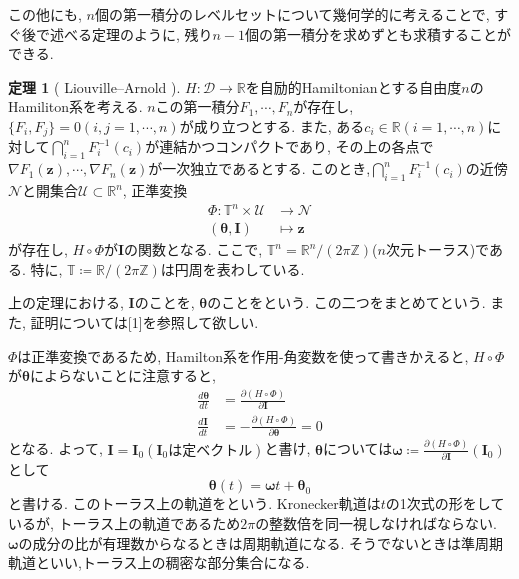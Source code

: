 \documentclass{ltjsarticle}
\theoremstyle{definition}
\newtheorem{thm}{定理}
\numberwithin{thm}{section}
\theoremstyle{definition}
\numberwithin{prop}{section}
\theoremstyle{definition}
\numberwithin{dfn}{section}
\numberwithin{equation}{section}
\begin{document}
この他にも, $n$個の第一積分のレベルセットについて幾何学的に考えることで, すぐ後で述べる定理のように, 残り$n-1$個の第一積分を求めずとも求積することができる.
\begin{thm}[ Liouville--Arnold ]
    $H:\mathcal{D}\to\mathbb{R}$を自励的Hamiltonianとする自由度$n$のHamiliton系を考える. $n$この第一積分$F_1,\cdots,F_n$が存在し, $\lbrace F_i,F_j\rbrace =0 (i,j=1,\cdots,n)$が成り立つとする. また, ある$c_i\in\mathbb{R}(i=1,\cdots,n)$に対して$\bigcap_{i=1}^n F_i^{-1}(c_i)$が連結かつコンパクトであり, その上の各点で$\nabla F_1(\bm{z}),\cdots,\nabla F_n(\bm{z})$が一次独立であるとする. このとき,$\bigcap_{i=1}^n F_i^{-1}(c_i)$の近傍$\mathcal{N}$と開集合$\mathcal{U}\subset\mathbb{R}^n$, 正準変換
    \begin{equation*}
        \begin{aligned}
            \Phi:\mathbb{T}^n\times\mathcal{U} &\to \mathcal{N} \\
            (\bm{\theta},\bm{I}) &\mapsto \bm{z}
        \end{aligned}
    \end{equation*}
    が存在し, $H\circ\Phi$が$\bm{I}$の関数となる. ここで, $\mathbb{T}^n = \mathbb{R}^n/(2\pi\mathbb{Z})$($n$次元トーラス)である. 特に, $\mathbb{T}\coloneq \mathbb{R}/(2\pi\mathbb{Z})$は円周を表わしている.
\end{thm}
上の定理における, $\bm{I}$のことを, $\bm{\theta}$のことをという. この二つをまとめてという. また, 証明については[1]を参照して欲しい.

$\Phi$は正準変換であるため, Hamilton系を作用-角変数を使って書きかえると, $H\circ\Phi$が$\bm{\theta}$によらないことに注意すると,
\begin{equation*} \label{LIthm:solution}
    \begin{aligned}
        \frac{d\bm{\theta}}{dt}&=\frac{\partial (H\circ\Phi)}{\partial\bm{I}} \\
        \frac{d\bm{I}}{dt}&=-\frac{\partial (H\circ\Phi)}{\partial\bm{\theta}}=0
    \end{aligned}
\end{equation*}
となる. よって, $\bm{I}=\bm{I}_0(\bm{I}_0\text{は定ベクトル})$と書け, $\bm{\theta}$については$\bm{\omega}\coloneq \frac{\partial (H\circ\Phi)}{\partial\bm{I}}(\bm{I}_0)$として
\begin{equation*}
    \bm{\theta}(t)=\bm{\omega}t+\bm{\theta}_0
\end{equation*}
と書ける. このトーラス上の軌道をという. Kronecker軌道は$t$の1次式の形をしているが, トーラス上の軌道であるため$2\pi$の整数倍を同一視しなければならない. $\bm{\omega}$の成分の比が有理数からなるときは周期軌道になる. そうでないときは準周期軌道といい,トーラス上の稠密な部分集合になる.
\end{document}
